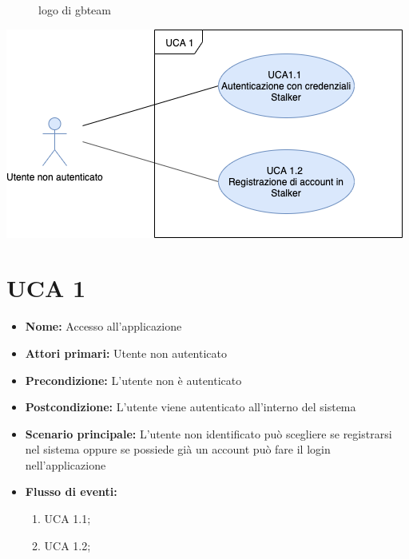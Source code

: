 \documentclass[a4paper, oneside, dvipsnames, table]{article} %
\begin{document}

\begin{figure}[h]
\caption{logo di gbteam}
\label{logo}
\end{figure}


\centering\includegraphics[scale=0.8]{Panoramica.png}
\section{UCA  1}%
\begin{itemize}
\item \textbf{Nome:} Accesso all'applicazione
\item \textbf{Attori primari:} Utente non autenticato
\item \textbf{Precondizione:} L’utente non è autenticato
\item \textbf{Postcondizione:} L’utente viene autenticato all’interno del sistema 
\item \textbf{Scenario principale:} L'utente non identificato può scegliere se registrarsi nel sistema oppure se possiede già un account può fare il login nell'applicazione %
\item \textbf{Flusso di eventi:}
    \begin{enumerate}
        \item UCA 1.1;
        \item UCA 1.2;
    \end{enumerate}

\end{itemize}
\end{document}
